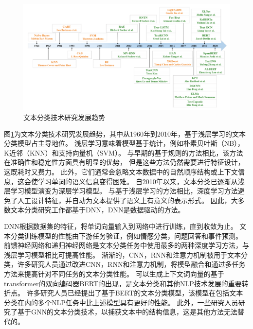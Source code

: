 \begin{figure}[htbp]
  \centering
  \includegraphics[width=16cm]{./images/text.png}
  \caption{文本分类技术研究发展趋势\cite{li2020survey}}
  \label{fig:textClassification}
\end{figure}

图\ref{fig:textClassification}为文本分类技术研究发展趋势，其中从1960年到2010年，基于浅层学习的文本分类模型占主导地位。
浅层学习意味着模型基于统计，例如朴素贝叶斯（NB），K近邻（KNN）和支持向量机（SVM）。
与早期的基于规则的方法相比，该方法在准确性和稳定性方面具有明显的优势，
但是这些方法仍然需要进行特征设计，这既耗时又费力。
此外，它们通常会忽略文本数据中的自然顺序结构或上下文信息，这会使学习单词的语义信息变得困难。
自2010年以来，文本分类已逐渐从浅层学习模型演变为深层学习模型。
与基于浅层学习的方法相比，深度学习方法避免了人工设计特征，并自动为文本提供了语义上有意义的表示形式。
因此，大多数文本分类研究工作都基于DNN，DNN是数据驱动的方法。

DNN根据数据集的特征，将单词向量输入到网络中进行训练，直到收敛为止。
文本分类训练模型的性能由下游任务验证，例如情感分类，问题回答和事件预测。
前馈神经网络和递归神经网络是文本分类任务中使用最多的两种深度学习方法，与浅层学习模型相比可提高性能。
渐渐的，CNN，RNN和注意力机制被用于文本分类，许多研究人员通过改进CNN，RNN和注意力机制，将模型融合和通过多任务方法来提高针对不同任务的文本分类性能。
可以生成上下文词向量的基于transformer的双向编码器BERT\cite{devlin2018bert}的出现，是文本分类和其他NLP技术发展的重要转折点。
许多研究人员已经提出了基于BERT的文本分类模型，该模型在包括文本分类在内的多个NLP任务中比上述模型具有更好的性能。
此外，一些研究人员研究了基于GNN的文本分类技术，以捕获文本中的结构信息，这是其他方法无法替代的。

